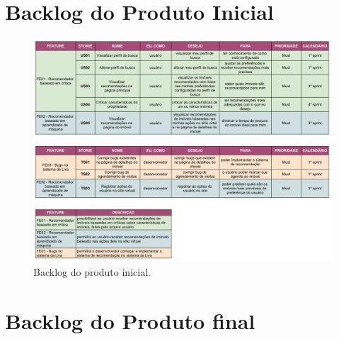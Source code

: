 \begin{apendicesenv}

\partapendices \chapter{Backlog do Produto Inicial} \label{apendice_backlog_inicial}

\begin{figure}[H]
    \centering
    \includegraphics[scale=0.32]{figuras/desenvolvimento/backlog-v1.png}
    \caption[Backlog do produto inicial]{Backlog do produto inicial.}
    \label{fig:apendice_backlog_inicial}
\end{figure}

\chapter{Backlog do Produto final} \label{apendice_backlog}


\end{apendicesenv}
